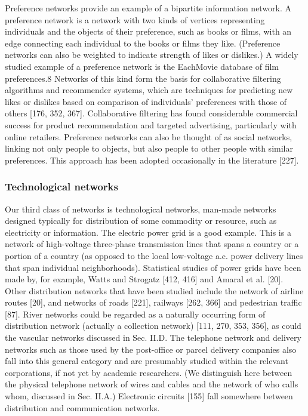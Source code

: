      Preference networks provide an example of a bipartite information network. A preference network is a network with two kinds of vertices representing individuals and the objects of their preference, such as books or films, with an edge connecting each individual to the books or films they like. (Preference networks can also be weighted to indicate strength of likes or dislikes.) A widely studied example of a preference network is the EachMovie database of film preferences.8 Networks of this kind form the basis for collaborative filtering algorithms and recommender systems, which are techniques for predicting new likes or dislikes based on comparison of individuals' preferences with those of others [176, 352, 367]. Collaborative filtering has found considerable commercial success for product recommendation and targeted advertising, particularly with online retailers. Preference networks can also be thought of as social networks, linking not only people to objects, but also people to other people with similar preferences. This approach has been adopted occasionally in the literature [227].
        
    \subsubsection{Technological networks}
    
      Our third class of networks is technological networks, man-made networks designed typically for distribution of some commodity or resource, such as electricity or information. The electric power grid is a good example. This is a network of high-voltage three-phase transmission lines that spans a country or a portion of a country (as opposed to the local low-voltage a.c. power delivery lines that span individual neighborhoods). Statistical studies of power grids have been made by, for example, Watts and Strogatz [412, 416] and Amaral et al. [20]. Other distribution networks that have been studied include the network of airline routes [20], and networks of roads [221], railways [262, 366] and pedestrian traffic [87]. River networks could be regarded as a naturally occurring form of distribution network (actually a collection network) [111, 270, 353, 356], as could the vascular networks discussed in Sec. II.D. The telephone network and delivery networks such as those used by the post-office or parcel delivery companies also fall into this general category and are presumably studied within the relevant corporations, if not yet by academic researchers. (We distinguish here between the physical telephone network of wires and cables and the network of who calls whom, discussed in Sec. II.A.) Electronic circuits [155] fall somewhere between distribution and communication networks.
      
